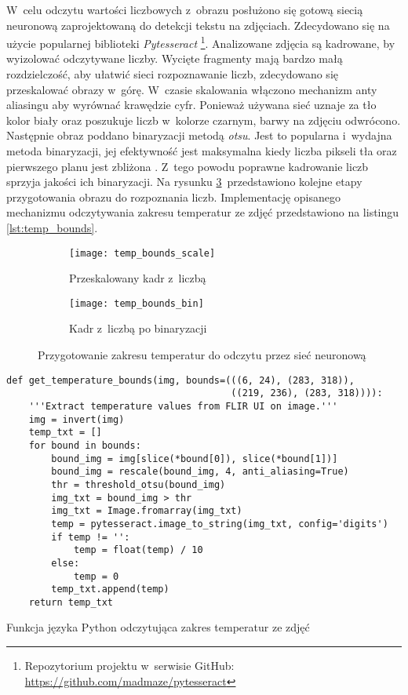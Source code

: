 W~celu odczytu wartości liczbowych z~obrazu posłużono się gotową siecią
neuronową zaprojektowaną do detekcji tekstu na zdjęciach.
Zdecydowano się na użycie popularnej biblioteki \emph{Pytesseract}%
\footnote{%
    Repozytorium projektu w~serwisie GitHub:
    \url{https://github.com/madmaze/pytesseract}}.
Analizowane zdjęcia są kadrowane, by wyizolować odczytywane liczby.
Wycięte fragmenty mają bardzo małą rozdzielczość, aby ułatwić sieci
rozpoznawanie liczb, zdecydowano się przeskalować obrazy w~górę.
W~czasie skalowania włączono mechanizm anty aliasingu aby wyrównać krawędzie
cyfr.
Ponieważ używana sieć uznaje za tło kolor biały oraz poszukuje liczb w~kolorze
czarnym, barwy na zdjęciu odwrócono.
Następnie obraz poddano binaryzacji metodą \emph{otsu}.
Jest to popularna i~wydajna metoda binaryzacji, jej efektywność jest maksymalna
kiedy liczba pikseli tła oraz pierwszego planu jest zbliżona
\cite{sezgin_thresholding}.
Z~tego powodu poprawne kadrowanie liczb sprzyja jakości ich binaryzacji.
Na rysunku \ref{fig:temp_bounds}~przedstawiono kolejne etapy przygotowania
obrazu do rozpoznania liczb.
Implementację opisanego mechanizmu odczytywania zakresu temperatur ze zdjęć
przedstawiono na listingu \ref{lst:temp_bounds}.
\begin{figure}[htbp]
    \hspace*{\fill}
    \begin{subfigure}{0.45\textwidth}
        \centering
        \texttt{[image: temp\_bounds\_scale]}
        \caption{Przeskalowany kadr z~liczbą}
        \label{fig:temp_bounds_scale}
    \end{subfigure}
    \hfill
    \begin{subfigure}{0.45\textwidth}
        \centering
        \texttt{[image: temp\_bounds\_bin]}
        \caption{Kadr z~liczbą po binaryzacji}
        \label{fig:temp_bounds_bin}
    \end{subfigure}
    \hspace*{\fill}
    \caption{Przygotowanie zakresu temperatur do odczytu przez sieć neuronową}
    \label{fig:temp_bounds}
\end{figure}

\begin{listing}[htbp]
\begin{verbatim}
def get_temperature_bounds(img, bounds=(((6, 24), (283, 318)),
                                        ((219, 236), (283, 318)))):
    '''Extract temperature values from FLIR UI on image.'''
    img = invert(img)
    temp_txt = []
    for bound in bounds:
        bound_img = img[slice(*bound[0]), slice(*bound[1])]
        bound_img = rescale(bound_img, 4, anti_aliasing=True)
        thr = threshold_otsu(bound_img)
        img_txt = bound_img > thr
        img_txt = Image.fromarray(img_txt)
        temp = pytesseract.image_to_string(img_txt, config='digits')
        if temp != '':
            temp = float(temp) / 10
        else:
            temp = 0
        temp_txt.append(temp)
    return temp_txt
\end{verbatim}
\caption{Funkcja języka Python odczytująca zakres temperatur ze zdjęć}
\label{lst:temp_bounds}
\end{listing}

